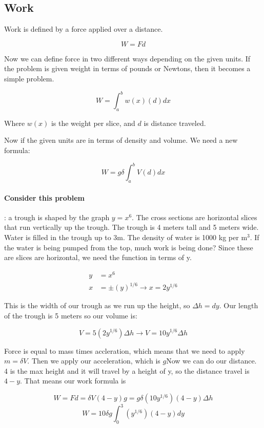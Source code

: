 \subsection{Work}

Work is defined by a force applied over a distance.  

\begin{equation}
	W = Fd 
\end{equation}

Now we can define force in two different ways depending on the given units. If the problem is given weight in terms of pounds or Newtons, then it becomes a simple problem. 

\begin{equation}
	W = \int_a^b{w(x)(d)} dx
\end{equation}

Where $w(x)$ is the weight per slice, and $d$ is distance traveled. 

Now if the given units are in terms of density and volume. We need a new formula:

\begin{equation}
	W = g\delta\int_a^bV(d)dx
\end{equation}

\paragraph{Consider this problem}: a trough is shaped by the graph $y=x^6$. The cross sections are horizontal slices that run vertically up the trough. The trough is 4 meters tall and 5 meters wide. Water is filled in the trough up to 3m. The density of water is 1000 kg per m$^3$. If the water is being pumped from the top, much work is being done? Since these are slices are horizontal, we need the function in terms of y. 

\begin{align}
	y &= x^6 \\ 
	x &= \pm (y)^{1/6} \to x = 2y^{1/6}
\end{align}

This is the width of our trough as we run up the height, so $\Delta h = dy$. Our length of the trough is 5 meters so our volume is: 

\begin{equation}
	V = 5(2y^{1/6})\Delta h \to V = 10y^{1/6}\Delta h
\end{equation}

Force is equal to mass times accleration, which means that we need to apply $m=\delta V$. Then we apply our acceleration, which is $g$Now we can do our distance. 4 is the max height and it will travel by a height of y, so the distance travel is $4-y$. That means our work formula is 

\begin{equation}
	W = Fd = \delta V(4-y)g = g\delta (10y^{1/6})(4-y)\Delta h
\end{equation}
\begin{equation}
	W = 10\delta g\int_0^3(y^{1/6})(4-y)dy
\end{equation}